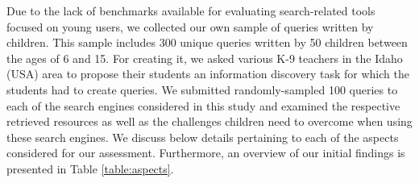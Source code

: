 \documentclass{sig-alternate-05-2015}
\begin{document}
Due to the lack of benchmarks available for evaluating search-related tools focused on young users, we collected our own sample of queries written by children. This sample includes 300 unique queries written by 50 children between the ages of 6 and 15. For creating it, we asked various K-9   teachers in the Idaho (USA) area to propose their students an information discovery task for which the students had to create queries. We submitted randomly-sampled 100 queries to each of the search engines considered in this study and examined the respective retrieved resources as well as the challenges children need to overcome when using these search engines. We discuss below details pertaining to each of the aspects  considered for our assessment. Furthermore, an overview of our initial findings is presented in Table \ref{table:aspects}. 
\end{document}
